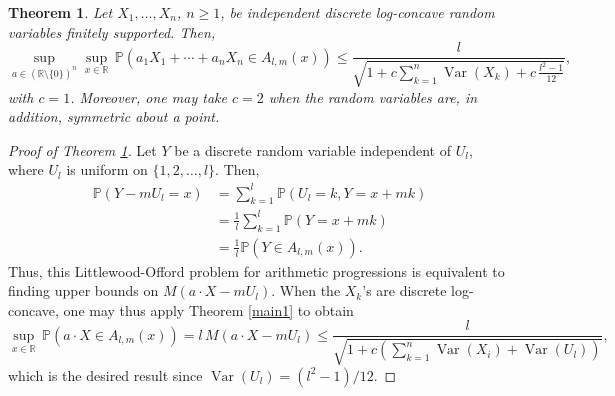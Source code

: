 \documentclass[10pt,a4paper]{amsart}
\newtheorem{thm}{Theorem}
\newcommand{\Prob}{\mathbb{P}}
\newcommand{\R}{\mathbb{R}}
\DeclareMathOperator{\Var}{Var}
\begin{document}
\begin{thm}\label{main3}
Let $X_1, \dots, X_n$, $n \geq 1$, be independent discrete log-concave random variables finitely supported. Then,
\begin{equation*}
\sup_{a \in (\R \setminus \{0\})^n} \sup_{x \in \R} \, \Prob(a_1 X_1 + \cdots + a_n X_n \in A_{l,m}(x)) \leq \frac{l}{\sqrt{1 + c \sum_{k=1}^n \Var(X_k) + c \, \frac{l^2-1}{12}}},
\end{equation*}
with $c=1$. Moreover, one may take $c = 2$ when the random variables are, in addition, symmetric about a point.
\end{thm}

\begin{proof}[Proof of Theorem \ref{main3}]
Let $Y$ be a discrete random variable independent of $U_l$, where $U_l$ is uniform on $\{1,2,\dots, l\}$. Then,
\begin{align*}
    \mathbb{P}(Y - m U_l = x) 
        &= 
            \sum_{k=1}^l \mathbb{P}(U_l = k, Y = x + mk ) 
                \\
        &=
            \frac 1 l \sum_{k=1}^l \mathbb{P}(Y = x +mk)
                \\
        &=
            \frac 1 l \mathbb{P}( Y \in A_{l,m}(x)).
\end{align*}
Thus, this Littlewood-Offord problem for arithmetic progressions is equivalent to finding upper bounds on $M(a \cdot X - m U_l)$. When the $X_k$'s are discrete log-concave, one may thus apply Theorem \ref{main1} to obtain
$$ \sup_{x \in \R} \, \mathbb{P}(a \cdot X \in A_{l,m}(x)) = l \, M(a \cdot X - m U_l) \leq \frac{l}{\sqrt{1 + c \left( \sum_{k=1}^n \Var(X_i) + \Var(U_l) \right)}}, $$
which is the desired result since $\Var(U_l) = (l^2-1)/12$.
\end{proof}
\end{document}
